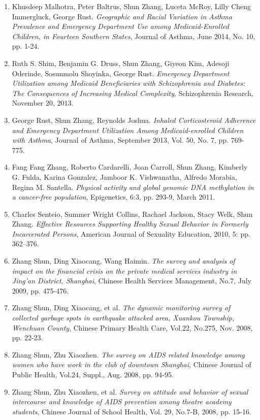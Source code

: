 \documentclass[letterpaper,11pt]{article}
\begin{document}
\begin{itemize}[leftmargin=0.15in, label={}]
{{\begin{enumerate}
    \item Khusdeep Malhotra, Peter Baltrus, Shun Zhang, Luceta McRoy, Lilly Cheng Immergluck, George Rust. \textit{Geographic and Racial Variation in Asthma Prevalence and Emergency Department Use among Medicaid-Enrolled Children, in Fourteen Southern States}, Journal of Asthma, June 2014, No. 10, pp. 1-24.
    \item Ruth S. Shim, Benjamin G. Druss, Shun Zhang, Giyeon Kim, Adesoji Oderinde, Sosunmolu Shoyinka, George Rust. \textit{Emergency Department Utilization among Medicaid Beneficiaries with Schizophrenia and Diabetes: The Consequences of Increasing Medical Complexity}, Schizophrenia Research, November 20, 2013.
    \item George Rust, Shun Zhang, Reynolds Joshua. \textit{Inhaled Corticosteroid Adherence and Emergency Department Utilization Among Medicaid-enrolled Children with Asthma}, Journal of Asthma, September 2013, Vol. 50, No. 7, pp. 769-775.
    \item Fang Fang Zhang, Roberto Cardarelli, Joan Carroll, Shun Zhang, Kimberly G. Fulda, Karina Gonzalez, Jamboor K. Vishwanatha, Alfredo Morabia, Regina M. Santella. \textit{Physical activity and global genomic DNA methylation in a cancer-free population}, Epigenetics, 6:3, pp. 293-9, March 2011.
    \item Charles Senteio, Summer Wright Collins, Rachael Jackson, Stacy Welk, Shun Zhang. \textit{Effective Resources Supporting Healthy Sexual Behavior in Formerly Incarcerated Persons}, American Journal of Sexuality Education, 2010, 5: pp. 362–376.
    \item Zhang Shun, Ding Xiaocang, Wang Haimin. \textit{The survey and analysis of impact on the financial crisis on the private medical services industry in Jing'an District, Shanghai}, Chinese Health Services Management, No.7, July 2009, pp. 475-476.
    \item Zhang Shun, Ding Xiaocang, et al. \textit{The dynamic monitoring survey of collected garbage spots in earthquake attacked area, Xuankou Township, Wenchuan County}, Chinese Primary Health Care, Vol.22, No.275, Nov. 2008, pp. 22-23.
    \item Zhang Shun, Zhu Xiaozhen. \textit{The survey on AIDS related knowledge among women who have work in the club of downtown Shanghai}, Chinese Journal of Public Health, Vol.24, Suppl., Aug. 2008, pp. 94-95.
    \item Zhang Shun, Zhu Xiaozhen, et al. \textit{Survey on attitude and behavior of sexual intercourse and knowledge of AIDS prevention among theatre academy students}, Chinese Journal of School Health, Vol. 29, No.7-B, 2008, pp. 15-16.

\end{enumerate}}}
\end{itemize}
\end{document}
